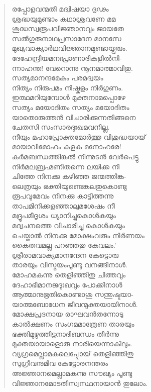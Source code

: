 \begin{verse}
രപ്പോളവന്മതി മദ്വിഷയാ ദൃഢം\\
ശ്രദ്ധയുമുണ്ടാം കഥാശ്രവണേ മമ\\
ശുദ്ധസ്വരൂപവിജ്ഞാനവും ജായതേ\\
സല്‍ഗുരുനാഥപ്രസാദേന മാനസേ\\
മുഖ്യവാക്യാര്‍ഥവിജ്ഞാനമുണ്ടായ്വരും.\\
ദേഹേന്ദ്രിയമനഃപ്രാണാദികളില്‍നി-\\
ന്നാഹന്ത! വേറൊന്നു നൂനമാത്മാവിതു.\\
സത്യമാനന്ദമേകം പരമദ്വയം\\
നിത്യം നിരുപമം നിഷ്കളം നിര്‍ഗുണം.\\
ഇത്ഥമറിയുമ്പോള്‍ മുക്തനാമപ്പൊഴേ\\
സത്യം മയോദിതം സത്യം മയോദിതം\\
യാതൊരുത്തന്‍ വിചാരിക്കുന്നതിങ്ങനെ\\
ചേതസി സംസാരദുഃഖമവനില്ല.\\
നീയും മഹാപ്രോക്തമോര്‍ത്തു വിശുദ്ധയായ്\\
മായാവിമോഹം കളക മനോഹരേ!\\
കര്‍മബന്ധത്തിങ്കല്‍ നിന്നുടന്‍ വേര്‍പെട്ടു\\
നിര്‍മലബ്രഹ്മണിതന്നെ ലയിക്ക നീ\\
ചിത്തേ നിനക്കു കഴിഞ്ഞ ജന്മത്തിങ്ക-\\
ലെത്രയും ഭക്തിയുണ്ടെങ്കലതുകൊണ്ടു\\
രൂപവുമേവം നിനക്കു കാട്ടിത്തന്നു\\
താപമിനിക്കളഞ്ഞാലുമശേഷം നീ\\
മദ്രൂപമീദൃശം ധ്യാനിച്ചുകൊള്‍കയും\\
മദ്വചനത്തെ വിചാരിച്ചു കൊള്‍കയും\\
ചെയ്താല്‍ നിനക്കു മോക്ഷംവരും നിര്‍ണയം\\
കൈതവമല്ല പറഞ്ഞതു കേവലം.’\\
ശ്രീരാമവാക്യമാനന്ദേന കേട്ടൊരു\\
താരയും വിസ്മയംപൂണ്ടു വനങ്ങിനാള്‍.\\
മോഹമകന്നു തെളിഞ്ഞിതു ചിത്തവും\\
ദേഹാഭിമാനജദുഃഖവും പോക്കിനാള്‍\\
ആത്മാനുഭൂതികൊണ്ടാശു സന്തുഷ്ടയാ-\\
യാത്മബോധേന ജീവന്മുക്തയായിനാള്‍.\\
മോക്ഷപ്രദനായ രാഘവന്‍തന്നോടു\\
കാല്‍ക്ഷണം സംഗമമാത്രേണ താരയും\\
ഭക്തിമുഴുത്തിട്ടനാദിബന്ധം തീര്‍ന്നു\\
മുക്തയായാളൊരു നാരിയെന്നാകിലും.\\
വ്യഗ്രമെല്ലാമകലെപ്പോയ് തെളിഞ്ഞിതു\\
സുഗ്രീവനുമിവ കേട്ടോരനന്തരം\\
അജ്ഞാനമെല്ലാമകന്നു സൗഖ്യം പൂണ്ടു\\
വിജ്ഞാനമോടതിസ്വസ്ഥനായാന്‍ തുലോം.
\end{verse}

